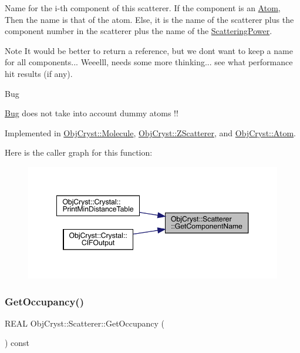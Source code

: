 Name for the i-\/th component of this scatterer. If the component is an \mbox{\hyperlink{class_obj_cryst_1_1_atom}{Atom}}, Then the name is that of the atom. Else, it is the name of the scatterer plus the component number in the scatterer plus the name of the \mbox{\hyperlink{class_obj_cryst_1_1_scattering_power}{Scattering\+Power}}. \begin{DoxyNote}{Note}
It would be better to return a reference, but we don\textquotesingle{}t want to keep a name for all components... Weeelll, needs some more thinking... see what performance hit results (if any).
\end{DoxyNote}
\begin{DoxyRefDesc}{Bug}
\item[\mbox{\hyperlink{bug__bug000001}{Bug}}]does not take into account dummy atoms !! \end{DoxyRefDesc}


Implemented in \mbox{\hyperlink{class_obj_cryst_1_1_molecule_aa72f797c744577e606fa6976d8c7dcf8}{Obj\+Cryst\+::\+Molecule}}, \mbox{\hyperlink{class_obj_cryst_1_1_z_scatterer_a8202be8515c4f9117b666a22724df13c}{Obj\+Cryst\+::\+Z\+Scatterer}}, and \mbox{\hyperlink{class_obj_cryst_1_1_atom_ab6a32c77f67ab2682e00cef7969a59fd}{Obj\+Cryst\+::\+Atom}}.

Here is the caller graph for this function\+:
\nopagebreak
\begin{figure}[H]
\begin{center}
\leavevmode
\includegraphics[width=348pt]{class_obj_cryst_1_1_scatterer_a42bdf508da6a90859a5a61e16c27d47e_icgraph}
\end{center}
\end{figure}
\mbox{\label{class_obj_cryst_1_1_scatterer_a6c063b27354d3885006a118de9816d69}} 
\subsubsection{\texorpdfstring{GetOccupancy()}{GetOccupancy()}}
{\footnotesize\ttfamily R\+E\+AL Obj\+Cryst\+::\+Scatterer\+::\+Get\+Occupancy (\begin{DoxyParamCaption}{ }\end{DoxyParamCaption}) const}



